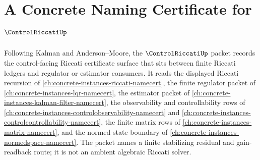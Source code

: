 \chapter{A Concrete Naming Certificate for $\ControlRiccatiUp$}
\label{ch:concrete-instances-control-riccati-namecert}

Following Kalman and Anderson--Moore, the $\ControlRiccatiUp$ packet records the control-facing Riccati certificate surface that sits between finite Riccati ledgers and regulator or estimator consumers. It reads the displayed Riccati recursion of \autoref{ch:concrete-instances-riccati-namecert}, the finite regulator packet of \autoref{ch:concrete-instances-lqr-namecert}, the estimator packet of \autoref{ch:concrete-instances-kalman-filter-namecert}, the observability and controllability rows of \autoref{ch:concrete-instances-controlobservability-namecert} and \autoref{ch:concrete-instances-controlcontrollability-namecert}, the finite matrix rows of \autoref{ch:concrete-instances-matrix-namecert}, and the normed-state boundary of \autoref{ch:concrete-instances-normedspace-namecert}. The packet names a finite stabilizing residual and gain-readback route; it is not an ambient algebraic Riccati solver.


